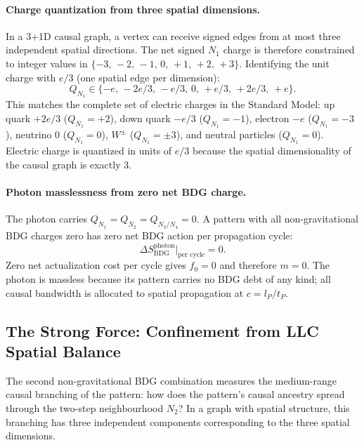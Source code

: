 \documentclass[11pt,a4paper]{article}
\newcommand{\SBDG}{S_{\mathrm{BDG}}}
\begin{document}
\paragraph{Charge quantization from three spatial dimensions.}
In a 3+1D causal graph, a vertex can receive signed edges from at most three
independent spatial directions. The net signed $N_1$ charge is therefore
constrained to integer values in $\{-3,\,-2,\,-1,\,0,\,+1,\,+2,\,+3\}$.
Identifying the unit charge with $e/3$ (one spatial edge per dimension):
\begin{equation}
  Q_{N_1} \in \{-e,\,-2e/3,\,-e/3,\,0,\,+e/3,\,+2e/3,\,+e\}.
  \label{eq:charge_quantization}
\end{equation}
This matches the complete set of electric charges in the Standard Model:
up quark $+2e/3$ ($Q_{N_1} = +2$), down quark $-e/3$ ($Q_{N_1} = -1$),
electron $-e$ ($Q_{N_1} = -3$), neutrino $0$ ($Q_{N_1} = 0$),
$W^\pm$ ($Q_{N_1} = \pm 3$), and neutral particles ($Q_{N_1} = 0$).
Electric charge is quantized in units of $e/3$ because the spatial
dimensionality of the causal graph is exactly 3.

\paragraph{Photon masslessness from zero net BDG charge.}
The photon carries $Q_{N_1} = Q_{N_2} = Q_{N_3/N_4} = 0$. A pattern with all
non-gravitational BDG charges zero has zero net BDG action per propagation cycle:
\begin{equation}
  \Delta \SBDG^{\text{photon}}\big|_{\text{per cycle}} = 0.
  \label{eq:photon_massless}
\end{equation}
Zero net actualization cost per cycle gives $f_0 = 0$ and therefore $m = 0$.
The photon is massless because its pattern carries no BDG debt of any kind;
all causal bandwidth is allocated to spatial propagation at $c = l_P/t_P$.

\subsection{The Strong Force: Confinement from LLC Spatial Balance}

The second non-gravitational BDG combination measures the medium-range
causal branching of the pattern: how does the pattern's causal ancestry
spread through the two-step neighbourhood $N_2$? In a graph with spatial
structure, this branching has three independent components corresponding to
the three spatial dimensions.
\end{document}
